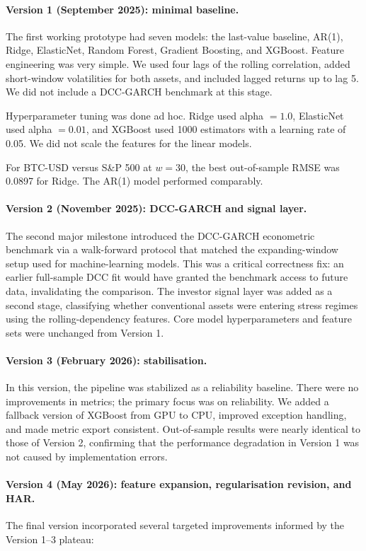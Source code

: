 \paragraph{Version 1 (September 2025): minimal baseline.}
The first working prototype had seven models: the last-value baseline, AR(1), Ridge, ElasticNet, Random Forest, Gradient Boosting, and XGBoost. Feature engineering was very simple. We used four lags of the rolling correlation, added short-window volatilities for both assets, and included lagged returns up to lag 5. We did not include a DCC-GARCH benchmark at this stage.

Hyperparameter tuning was done ad hoc. Ridge used alpha $= 1.0$, ElasticNet used alpha $= 0.01$, and XGBoost used 1000 estimators with a learning rate of 0.05. We did not scale the features for the linear models.

For BTC-USD versus S\&P 500 at $w = 30$, the best out-of-sample RMSE was 0.0897 for Ridge. The AR(1) model performed comparably.

\paragraph{Version 2 (November 2025): DCC-GARCH and signal layer.}
The second major milestone introduced the DCC-GARCH econometric benchmark via a walk-forward protocol that matched the expanding-window setup used for machine-learning models. This was a critical correctness fix: an earlier full-sample DCC fit would have granted the benchmark access to future data, invalidating the comparison. The investor signal layer was added as a second stage, classifying whether conventional assets were entering stress regimes using the rolling-dependency features. Core model hyperparameters and feature sets were unchanged from Version 1.

\paragraph{Version 3 (February 2026): stabilisation.}
In this version, the pipeline was stabilized as a reliability baseline. There were no improvements in metrics; the primary focus was on reliability. We added a fallback version of XGBoost from GPU to CPU, improved exception handling, and made metric export consistent. Out-of-sample results were nearly identical to those of Version 2, confirming that the performance degradation in Version 1 was not caused by implementation errors.

\paragraph{Version 4 (May 2026): feature expansion, regularisation revision, and HAR.} The final version incorporated several targeted improvements informed by the Version 1--3 plateau:

